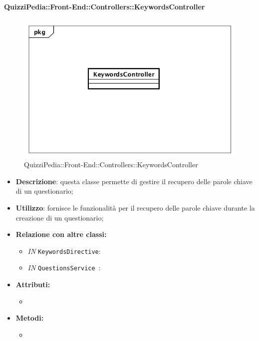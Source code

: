 \paragraph{QuizziPedia::Front-End::Controllers::KeywordsController}
\begin{figure}
	\centering
	\includegraphics[scale=0.45]{UML/Classi/Front-End/QuizziPedia_Front-end_Controller_KeywordsController.png}
	\caption{QuizziPedia::Front-End::Controllers::KeywordsController}
\end{figure}
\begin{itemize}
	\item \textbf{Descrizione}: questa classe permette di gestire il recupero delle parole chiave di un questionario;
	\item \textbf{Utilizzo}: fornisce le funzionalità per il recupero delle parole chiave durante la creazione di un questionario;
	\item \textbf{Relazione con altre classi:}
	\begin{itemize}
		\item \textit{IN} \texttt{KeywordsDirective}: 
		\item \textit{IN} \texttt{QuestionsService }: 
	\end{itemize}
	\item \textbf{Attributi:}
	\begin{itemize}
		\item 
	\end{itemize}
	\item \textbf{Metodi:}
	\begin{itemize}
		\item 
	\end{itemize}
\end{itemize}

